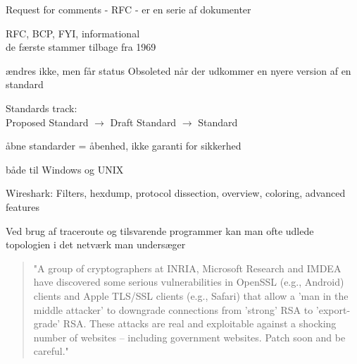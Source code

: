 \documentclass[20pt,landscape,a4paper]{foils}
\begin{document}
\begin{list1}
\item Request for comments - RFC - er en serie af dokumenter
\item RFC, BCP, FYI, informational\\
de færste stammer tilbage fra 1969
\item ændres ikke, men får status Obsoleted når der udkommer en nyere
  version af en standard
\item Standards track:\\
Proposed Standard $\rightarrow$ Draft Standard $\rightarrow$ Standard
\item  åbne standarder = åbenhed, ikke garanti for sikkerhed
\end{list1}







\centerline{}
\centerline{både til Windows og UNIX}


Wireshark: Filters, hexdump, protocol dissection, overview, coloring, advanced features





\begin{list1}
\item Ved brug af traceroute og tilsvarende programmer kan man ofte
  udlede topologien i det netværk man undersæger
\end{list1}










\begin{quote}
"A group of cryptographers at INRIA, Microsoft Research and IMDEA have discovered some serious vulnerabilities in OpenSSL (e.g., Android) clients and Apple TLS/SSL clients (e.g., Safari) that allow a 'man in the middle attacker' to downgrade connections from 'strong' RSA to 'export-grade' RSA. These attacks are real and exploitable against a shocking number of websites -- including government websites. Patch soon and be careful."
\end{quote}
\end{document}
